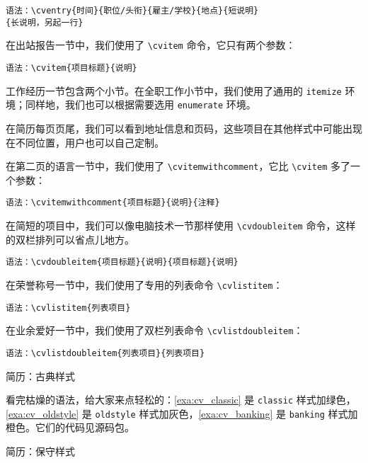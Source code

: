 \verb|语法：\cventry{时间}{职位/头衔}{雇主/学校}{地点}{短说明}|
\newline
\verb|                      {长说明，另起一行}|

在出站报告一节中，我们使用了 \verb|\cvitem| 命令，它只有两个参数：

\verb|语法：\cvitem{项目标题}{说明}|

工作经历一节包含两个小节。在全职工作小节中，我们使用了通用的 \texttt{itemize} 环境；同样地，我们也可以根据需要选用 \texttt{enumerate} 环境。

在简历每页页尾，我们可以看到地址信息和页码，这些项目在其他样式中可能出现在不同位置，用户也可以自己定制。

在第二页的语言一节中，我们使用了 \verb|\cvitemwithcomment|，它比 \verb|\cvitem| 多了一个参数：

\verb|语法：\cvitemwithcomment{项目标题}{说明}{注释}|

在简短的项目中，我们可以像电脑技术一节那样使用 \verb|\cvdoubleitem| 命令，这样的双栏排列可以省点儿地方。

\verb|语法：\cvdoubleitem{项目标题}{说明}{项目标题}{说明}|

在荣誉称号一节中，我们使用了专用的列表命令 \verb|\cvlistitem|：

\verb|语法：\cvlistitem{列表项目}|

在业余爱好一节中，我们使用了双栏列表命令 \verb|\cvlistdoubleitem|：

\verb|语法：\cvlistdoubleitem{列表项目}{列表项目}|

\begin{example}[htbp]
\begin{Demo}
\centering
{}
\end{Demo}
\caption{简历：古典样式}
\label{exa:cv_classic}
\end{example}

看完枯燥的语法，给大家来点轻松的：\autoref{exa:cv_classic} 是 \texttt{classic} 样式加绿色，\autoref{exa:cv_oldstyle} 是 \texttt{oldstyle} 样式加灰色，\autoref{exa:cv_banking} 是 \texttt{banking} 样式加橙色。它们的代码见源码包。


\begin{example}[htbp]
\begin{Demo}
\centering
{}
\end{Demo}
\caption{简历：保守样式}
\label{exa:cv_oldstyle}
\end{example}


